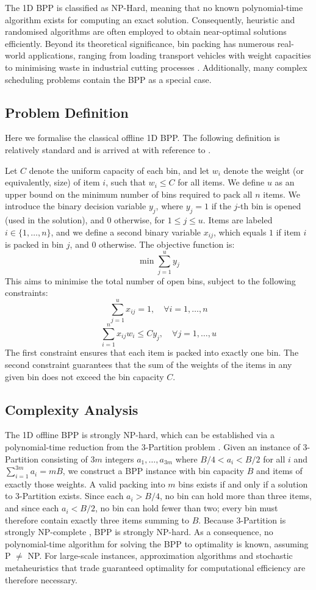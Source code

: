 \documentclass[11pt]{article}
\begin{document}
The 1D BPP is classified as NP-Hard, meaning that no known polynomial-time algorithm exists for computing an exact solution. Consequently, heuristic and randomised algorithms are often employed to obtain near-optimal solutions efficiently. Beyond its theoretical significance, bin packing has numerous real-world applications, ranging from loading transport vehicles with weight capacities to minimising waste in industrial cutting processes \cite{munien}. Additionally, many complex scheduling problems contain the BPP as a special case.

\subsection{Problem Definition}
Here we formalise the classical offline 1D BPP. The following definition is relatively standard and is arrived at with reference to \cite{maxence}. 

Let $C$ denote the uniform capacity of each bin, and let $w_{i}$ denote the weight (or equivalently, size) of item $i$, such that $w_{i} \leq C$ for all items. We define $u$ as an upper bound on the minimum number of bins required to pack all $n$ items. We introduce the binary decision variable $y_{j}$, where $y_j = 1$ if the $j$-th bin is opened (used in the solution), and $0$ otherwise, for $1 \leq j \leq u$. Items are labeled $i \in \{1, \dots, n\}$, and we define a second binary variable $x_{ij}$, which equals $1$ if item $i$ is packed in bin $j$, and $0$ otherwise. The objective function is:
$$ \min\sum_{j=1}^{u} y_j $$ 
This aims to minimise the total number of open bins, subject to the following constraints:
$$ \sum_{j=1}^{u} x_{ij} = 1, \quad \forall i = 1, \dots, n $$
$$ \sum_{i=1}^{n} x_{ij} w_{i}  \leq C y_j, \quad \forall j = 1, \dots, u $$
The first constraint ensures that each item is packed into exactly one bin. The second constraint guarantees that the sum of the weights of the items in any given bin does not exceed the bin capacity $C$.

\subsection{Complexity Analysis}

The 1D offline BPP is strongly NP-hard, which can be established via a polynomial-time reduction from the 3-Partition problem \cite{garey}. Given an instance of 3-Partition consisting of $3m$ integers $a_1, \dots, a_{3m}$ where $B/4 < a_i < B/2$ for all $i$ and $\sum_{i=1}^{3m} a_i = mB$, we construct a BPP instance with bin capacity $B$ and items of exactly those weights. A valid packing into $m$ bins exists if and only if a solution to 3-Partition exists. Since each $a_i > B/4$, no bin can hold more than three items, and since each $a_i < B/2$, no bin can hold fewer than two; every bin must therefore contain exactly three items summing to $B$. Because 3-Partition is strongly NP-complete \cite{garey}, BPP is strongly NP-hard. As a consequence, no polynomial-time algorithm for solving the BPP to optimality is known, assuming P $\neq$ NP. For large-scale instances, approximation algorithms and stochastic metaheuristics that trade guaranteed optimality for computational efficiency are therefore necessary.
\end{document}
